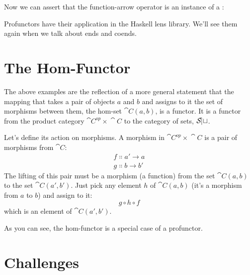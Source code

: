 \noindent
Now we can assert that the function-arrow operator is an instance of a
:

Profunctors have their application in the Haskell lens library. We'll
see them again when we talk about ends and coends.

\section{The Hom-Functor}

The above examples are the reflection of a more general statement that
the mapping that takes a pair of objects $a$ and $b$ and
assigns to it the set of morphisms between them, the hom-set
$\cat{C}(a, b)$, is a functor. It is a functor from the product
category $\cat{C}^{op}\times{}\cat{C}$ to the category of sets, $\mathcal{S\mkern-3mu et}$.

Let's define its action on morphisms. A morphism in
$\cat{C}^{op}\times{}\cat{C}$ is a pair of morphisms from $\cat{C}$:
\begin{gather*}
f \Colon a' \to a \\
g \Colon b \to b'
\end{gather*}
The lifting of this pair must be a morphism (a function) from the set
$\cat{C}(a, b)$ to the set $\cat{C}(a', b')$. Just pick
any element $h$ of $\cat{C}(a, b)$ (it's a morphism from
$a$ to $b$) and assign to it:
\[g \circ h \circ f\]
which is an element of $\cat{C}(a', b')$.

As you can see, the hom-functor is a special case of a profunctor.

\section{Challenges}

